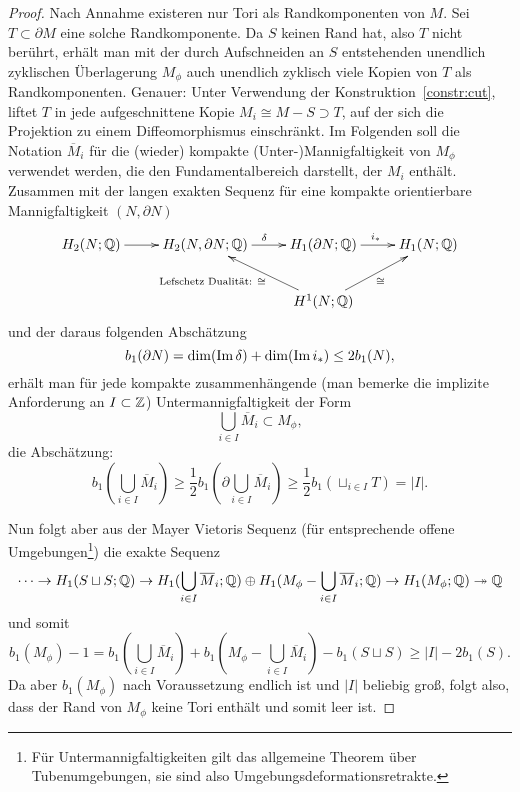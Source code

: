 \begin{proof}
	 Nach Annahme existeren nur Tori als Randkomponenten von $M$. Sei $T \subset \partial M$ eine solche Randkomponente. Da $S$ keinen Rand hat, also $T$ nicht berührt, erhält man mit der durch Aufschneiden an $S$ entstehenden unendlich zyklischen Überlagerung $M_\phi$ auch unendlich zyklisch viele Kopien von $T$ als Randkomponenten. Genauer: Unter Verwendung der Konstruktion~\ref{constr:cut}, liftet $T$ in jede aufgeschnittene Kopie $M_i \cong M - S \supset T$, auf der sich die Projektion zu einem Diffeomorphismus einschränkt. Im Folgenden soll die Notation $\overline M_i$ für die (wieder) kompakte (Unter-)Mannigfaltigkeit von $M_\phi$ verwendet werden, die den Fundamentalbereich darstellt, der $M_i$ enthält. Zusammen mit der langen exakten Sequenz für eine kompakte orientierbare Mannigfaltigkeit $(N,\partial N)$
	\[
	 \begin{xy}
	 	\xymatrix{
	 	H_2(N;\QQ) \ar[r]&  H_2(N,\partial N ; \QQ) \ar[r]^\delta & H_1(\partial N;\QQ) \ar[r]^{i_*}& H_1(N;\QQ) \\
	 	& &H^1(N;\QQ) \ar[ru]_{\cong} \ar[lu]^{\text{Lefschetz Dualität: }\cong \qquad~}&}
	 \end{xy}
	 \] 
	 und der daraus folgenden Abschätzung
	 \[
	 	b_1(\partial N) = \dim(\operatorname{Im} \delta) + \dim(\operatorname{Im} i_*) \leq  2b_1(N),
	 \]
	 erhält man für jede kompakte zusammenhängende (man bemerke die implizite Anforderung an $I\subset \mathbb{Z}$) Untermannigfaltigkeit der Form 
	 \[
	  	\bigcup_{i\in I} \overline M_i \subset M_\phi ,
	  \]
	  die Abschätzung:
	  \[
	   	b_1(\bigcup_{i\in I} \overline M_i)\geq \frac{1}{2}b_1(\partial \bigcup_{i\in I} \overline M_i) \geq \frac{1}{2}b_1(\sqcup_{i \in I}T) = |I|.
	  \]


	 \noindent Nun folgt aber aus der Mayer Vietoris Sequenz (für entsprechende offene Umgebungen\footnote{Für Untermannigfaltigkeiten gilt das allgemeine Theorem über Tubenumgebungen, sie sind also Umgebungsdeformationsretrakte.}) die exakte Sequenz
	  \[
	  	\cdots\to H_1(S\sqcup S;\mathbb{Q}) \to H_1(\bigcup_{i \in I} \overline M_i;\mathbb{Q}) \oplus H_1(M_\phi -\bigcup_{i \in I} \overline M_i;\mathbb{Q}) \to H_1(M_\phi;\mathbb{Q}) \twoheadrightarrow \mathbb{Q}
	  \]
	  und somit
	  \[
	  	b_1(M_\phi) -1= b_1(\bigcup_{i \in I} \overline M_i)+b_1(M_\phi -\bigcup_{i \in I} \overline M_i)-b_1(S\sqcup S) \geq |I| -2b_1(S).
	  \]
	  Da aber $b_1(M_\phi)$ nach Voraussetzung endlich ist und $|I|$ beliebig groß, folgt also, dass der Rand von $M_\phi$ keine Tori enthält und somit leer ist.


\end{proof}
